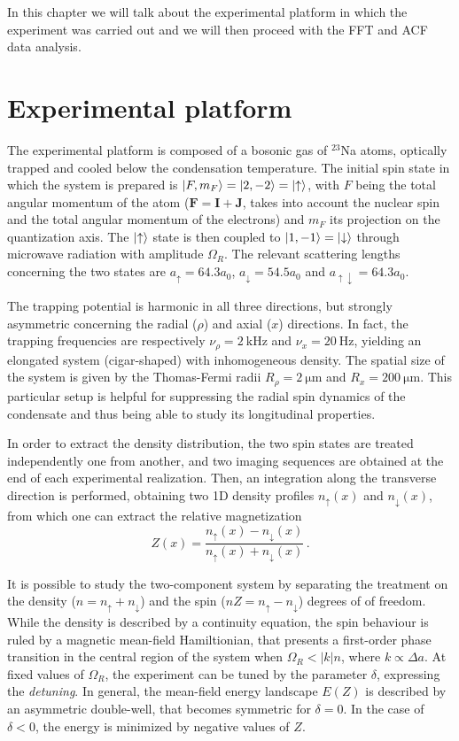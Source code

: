 In this chapter we will talk about the experimental platform in which the experiment was carried out and we will then proceed with the FFT and ACF data analysis.

\section{Experimental platform}
The experimental platform is composed of a bosonic gas of $^{23}$Na atoms, optically trapped and cooled below the condensation temperature. The initial spin state in which the system is prepared is $\ket{F, m_F} = \ket{2, -2} = \ket{\uparrow}$, with $F$ being the total angular momentum of the atom ($\mathbf{F} = \mathbf{I} + \mathbf{J}$, takes into account the nuclear spin and the total angular momentum of the electrons) and $m_F$ its projection on the quantization axis. The $\ket{\uparrow}$ state is then coupled to $\ket{1, -1} = \ket{\downarrow}$ through microwave radiation with amplitude $\Omega_R$. The relevant scattering lengths concerning the two states are $a_\uparrow = 64.3 a_0$, $a_\downarrow = 54.5 a_0$ and $a_{\uparrow\downarrow} = 64.3 a_0$.

The trapping potential is harmonic in all three directions, but strongly asymmetric concerning the radial ($\rho$) and axial ($x$) directions. In fact, the trapping frequencies are respectively $\nu_\rho = 2\ \unit{\kilo\hertz}$ and $\nu_x = 20\ \unit{\hertz}$, yielding an elongated system (cigar-shaped) with inhomogeneous density. The spatial size of the system is given by the Thomas-Fermi radii $R_\rho = 2\ \unit{\micro\meter}$ and $R_x = 200\ \unit{\micro\meter}$. This particular setup is helpful for suppressing the radial spin dynamics of the condensate and thus being able to study its longitudinal properties.

In order to extract the density distribution, the two spin states are treated independently one from another, and two imaging sequences are obtained at the end of each experimental realization. Then, an integration along the transverse direction is performed, obtaining two 1D density profiles $n_\uparrow(x)$ and $n_\downarrow(x)$, from which one can extract the relative magnetization
\begin{equation}
    Z(x) = \frac{n_\uparrow(x) - n_\downarrow(x)}{n_\uparrow(x) + n_\downarrow(x)}\, .
    \label{eq:magnetization}
\end{equation}

It is possible to study the two-component system by separating the treatment on the density ($n = n_\uparrow + n_\downarrow$) and the spin ($nZ = n_\uparrow - n_\downarrow$) degrees of of freedom. 
While the density is described by a continuity equation, the spin behaviour is ruled by a magnetic mean-field Hamiltionian, that presents a first-order phase transition in the central region of the system when $\Omega_R < |k|n$, where $k \propto \Delta a$. At fixed values of $\Omega_R$, the experiment can be tuned by the parameter $\delta$, expressing the \textit{detuning}. In general, the mean-field energy landscape $E(Z)$ is described by an asymmetric double-well, that becomes symmetric for $\delta = 0$. In the case of $\delta < 0$, the energy is minimized by negative values of $Z$. 

